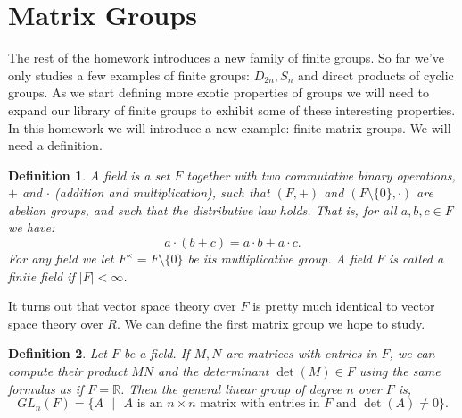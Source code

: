 \documentclass[11pt]{article}
\newtheorem{definition}{Definition}
\newcommand{\bR}{\mathbb{R}}
\begin{document}
\section{Matrix Groups}
The rest of the homework introduces a new family of finite groups.  So far we've only studies a few examples of finite groups: $D_{2n},S_n$ and direct products of cyclic groups.  As we start defining more exotic properties of groups we will need to expand our library of finite groups to exhibit some of these interesting properties.  In this homework we will introduce a new example: finite matrix groups.  We will need a definition.
\begin{definition}
  A \textit{field} is a set $F$ together with two commutative binary operations, $+$ and $\cdot$ (addition and multiplication), such that $(F,+)$ and $(F\setminus\{0\},\cdot)$ are abelian groups, and such that the distributive law holds.  That is, for all $a,b,c\in F$ we have:
  \[a\cdot(b+c) = a\cdot b + a\cdot c.\]
  For any field we let $F^\times = F\setminus\{0\}$ be its \textit{mutliplicative group}.  A field $F$ is called a finite field if $|F|<\infty$.
\end{definition}
It turns out that vector space theory over $F$ is pretty much identical to vector space theory over $R$.  We can define the first matrix group we hope to study.
\begin{definition}
  Let $F$ be a field.  If $M,N$ are matrices with entries in $F$, we can compute their product $MN$ and the determinant $\det(M)\in F$ using the same formulas as if $F=\bR$.  Then the \textit{general linear group of degree} $n$ over $F$ is,
  \[GL_n(F) = \{A\text{ }|\text{ } A\text{ is an }n\times n\text{ matrix with entries in }F\text{ and }\det(A)\not=0\}.\]
\end{definition}
\end{document}
